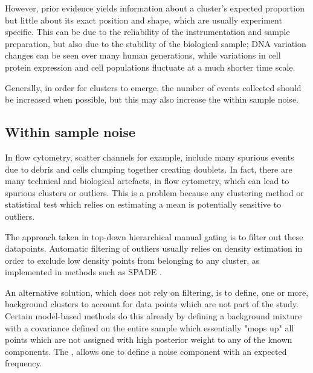 However, prior evidence yields information about a cluster's expected proportion but little about its exact position and shape, which are usually experiment specific.
This can be due to the reliability of the instrumentation and sample preparation, but also due to the stability of the biological sample; DNA variation changes can be seen over many human generations, while variations in cell protein expression and cell populations fluctuate at a much shorter time scale.

Generally, in order for clusters to emerge, the number of events collected should be increased when possible, but this may also increase the within sample noise.


\subsection{ Within sample noise }

In flow cytometry, scatter channels for example, include many spurious events due to debris and cells clumping together creating doublets.
In fact, there are many technical and biological artefacts, in flow cytometry, which can lead to spurious clusters or outliers.
This is a problem because any clustering method or statistical test which relies on estimating a mean is potentially sensitive to outliers.

The approach taken in top-down hierarchical manual gating is to filter out these datapoints.
Automatic filtering of outliers usually relies on density estimation in order to exclude low density points from belonging to any cluster, as implemented in methods such as SPADE \citep{Simonds:2011jh}.

An alternative solution, which does not rely on filtering, is to define, one or more, background clusters to account for data points which are not part of the study.
Certain model-based methods do this already by defining a background mixture with a covariance defined on the entire sample which essentially "mops up" all points which are not assigned with high posterior weight to any of the known components.
The , allows one to define a noise component with an expected frequency.

